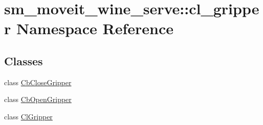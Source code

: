 \hypertarget{namespacesm__moveit__wine__serve_1_1cl__gripper}{}\section{sm\+\_\+moveit\+\_\+wine\+\_\+serve\+:\+:cl\+\_\+gripper Namespace Reference}
\label{namespacesm__moveit__wine__serve_1_1cl__gripper}
\subsection*{Classes}
\begin{DoxyCompactItemize}
\item 
class \hyperlink{classsm__moveit__wine__serve_1_1cl__gripper_1_1CbCloseGripper}{Cb\+Close\+Gripper}
\item 
class \hyperlink{classsm__moveit__wine__serve_1_1cl__gripper_1_1CbOpenGripper}{Cb\+Open\+Gripper}
\item 
class \hyperlink{classsm__moveit__wine__serve_1_1cl__gripper_1_1ClGripper}{Cl\+Gripper}
\end{DoxyCompactItemize}
